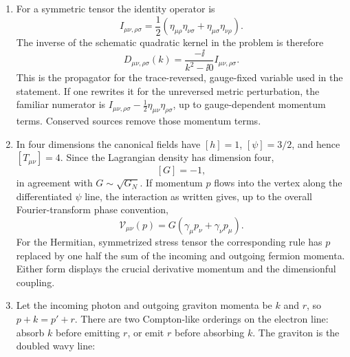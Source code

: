 \begin{enumerate}
\begin{enumerate}
\item
For a symmetric tensor the identity operator is
\[
 I_{\mu\nu,\rho\sigma}
 =\frac12\left(
 \eta_{\mu\rho}\eta_{\nu\sigma}
 +\eta_{\mu\sigma}\eta_{\nu\rho}\right).
\]
The inverse of the schematic quadratic kernel in the problem is therefore
\[
 D_{\mu\nu,\rho\sigma}(k)
 =\frac{-\ii}{k^2-\ii0}I_{\mu\nu,\rho\sigma}.
\]
This is the propagator for the trace-reversed, gauge-fixed variable used in
the statement.  If one rewrites it for the unreversed metric perturbation,
the familiar numerator is
\(I_{\mu\nu,\rho\sigma}-\tfrac12\eta_{\mu\nu}\eta_{\rho\sigma}\), up to
gauge-dependent momentum terms.  Conserved sources remove those momentum
terms.
\item
In four dimensions the canonical fields have
\([h]=1\), \([\psi]=3/2\), and hence \([T_{\mu\nu}]=4\).  Since the
Lagrangian density has dimension four,
\[
 [G]=-1,
\]
in agreement with \(G\sim\sqrt{G_N}\).  If momentum \(p\) flows into the
vertex along the differentiated \(\psi\) line, the interaction as written
gives, up to the overall Fourier-transform phase convention,
\[
 \mathcal V_{\mu\nu}(p)
 =G(\gamma_\mu p_\nu+\gamma_\nu p_\mu).
\]
For the Hermitian, symmetrized stress tensor the corresponding rule has
\(p\) replaced by one half the sum of the incoming and outgoing fermion
momenta.  Either form displays the crucial derivative momentum and the
dimensionful coupling.
\item
Let the incoming photon and outgoing graviton momenta be \(k\) and \(r\),
so \(p+k=p'+r\).  There are two Compton-like orderings on the electron
line: absorb \(k\) before emitting \(r\), or emit \(r\) before absorbing
\(k\).  The graviton is the doubled wavy line:
\begin{center}
\end{center}
\end{enumerate}
\end{enumerate}
